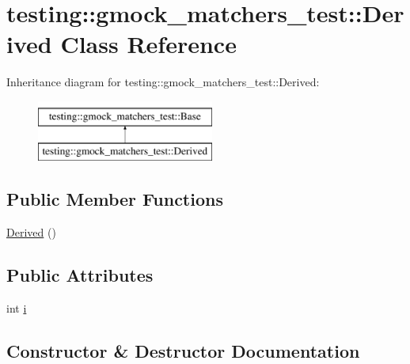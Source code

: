 \hypertarget{classtesting_1_1gmock__matchers__test_1_1Derived}{}\section{testing\+::gmock\+\_\+matchers\+\_\+test\+::Derived Class Reference}
\label{classtesting_1_1gmock__matchers__test_1_1Derived}
Inheritance diagram for testing\+::gmock\+\_\+matchers\+\_\+test\+::Derived\+:\begin{figure}[H]
\begin{center}
\leavevmode
\includegraphics[height=2.000000cm]{classtesting_1_1gmock__matchers__test_1_1Derived}
\end{center}
\end{figure}
\subsection*{Public Member Functions}
\begin{DoxyCompactItemize}
\item 
\mbox{\hyperlink{classtesting_1_1gmock__matchers__test_1_1Derived_a3de17d9e4bfb19dcafb88d3cccbbeaf2}{Derived}} ()
\end{DoxyCompactItemize}
\subsection*{Public Attributes}
\begin{DoxyCompactItemize}
\item 
int \mbox{\hyperlink{classtesting_1_1gmock__matchers__test_1_1Derived_a357d6747c44d7af7159fb5898a782f1b}{i}}
\end{DoxyCompactItemize}


\subsection{Constructor \& Destructor Documentation}
\mbox{\label{classtesting_1_1gmock__matchers__test_1_1Derived_a3de17d9e4bfb19dcafb88d3cccbbeaf2}} 
